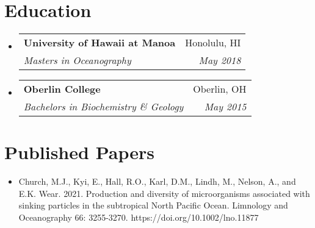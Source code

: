 \documentclass[letterpaper,11pt]{article}
\makeatletter
\newcommand{\ressubheading}[4]{
\begin{tabular*}{6.5in}{l@{\extracolsep{\fill}}r}
		\textbf{#1} & #2 \\
		\textit{#3} & \textit{#4} \\
\end{tabular*}\vspace{-6pt}}
\makeatother
\begin{document}
\section{Education}
\begin{itemize}
\item
    \ressubheading{University of Hawaii at Manoa}{Honolulu, HI}{Masters in Oceanography}{May 2018}
\item
    \ressubheading{Oberlin College}{Oberlin, OH}{Bachelors in Biochemistry \& Geology}{May 2015}
\end{itemize}

\section{Published Papers}
\begin{itemize}
\item
	{Church, M.J., Kyi, E., Hall, R.O., Karl, D.M., Lindh, M., Nelson, A., and E.K. Wear. 2021. Production and diversity of microorganisms associated with sinking particles in the subtropical North Pacific Ocean. Limnology and Oceanography 66: 3255-3270. https://doi.org/10.1002/lno.11877}
\end{itemize}
\end{document}

